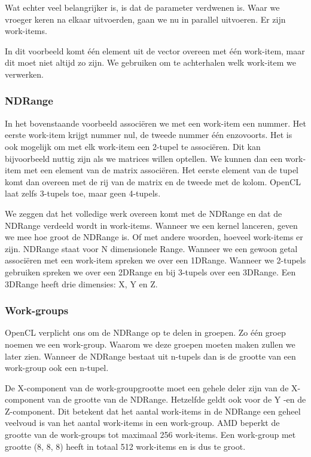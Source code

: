 Wat echter veel belangrijker is, is dat de parameter  verdwenen is. Waar we vroeger   keren na elkaar uitvoerden, gaan we nu  %
in parallel uitvoeren. Er zijn  work-items. 

In dit voorbeeld komt \'e\'en element uit de vector overeen met \'e\'en work-item, maar dit moet niet altijd zo zijn. We gebruiken  om te achterhalen welk work-item we verwerken.

\subsubsection{NDRange}
In het bovenstaande voorbeeld associ\"eren we met een work-item een nummer. Het eerste work-item krijgt nummer nul, de tweede nummer \'e\'en enzovoorts. Het is ook mogelijk om met elk work-item een 2-tupel te associ\"eren. Dit kan bijvoorbeeld nuttig zijn als we matrices willen optellen. We kunnen dan een work-item met een element van de matrix associ\"eren. Het eerste element van de tupel komt dan overeen met de rij van de matrix en de tweede met de kolom. OpenCL laat zelfs 3-tupels toe, maar geen 4-tupels.

We zeggen dat het volledige werk overeen komt met de NDRange en dat de NDRange verdeeld wordt in work-items. Wanneer we een kernel lanceren, geven we mee hoe groot de NDRange is. Of met andere woorden, hoeveel work-items er zijn. NDRange staat voor N dimensionele Range. Wanneer we een gewoon getal associ\"eren met een work-item spreken we over een 1DRange. Wanneer we 2-tupels gebruiken spreken we over een 2DRange en bij 3-tupels over een 3DRange. Een 3DRange heeft drie dimensies: X, Y en Z.

\subsubsection{Work-groups}
OpenCL verplicht ons om de NDRange op te delen in groepen. Zo \'e\'en groep noemen we een work-group. Waarom we deze groepen moeten maken zullen we later zien. Wanneer de NDRange bestaat uit n-tupels dan is de grootte van een work-group ook een n-tupel.

De X-component van de work-groupgrootte moet een gehele deler zijn van de X-component van de grootte van de NDRange. Hetzelfde geldt ook voor de Y -en de Z-component. Dit betekent dat het aantal work-items in de NDRange een geheel veelvoud is van het aantal work-items in een work-group. AMD beperkt de grootte van de work-groups tot maximaal 256 work-items. Een work-group met grootte (8, 8, 8) heeft in totaal 512 work-items en is dus te groot.


